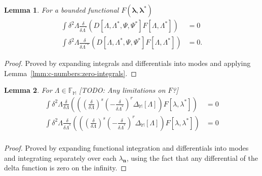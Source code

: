 \documentclass[12pt,aip,jmp,amssymb,amsmath]{revtex4-1}
\newtheorem{lemma}{Lemma}
\begin{document}
\begin{lemma}
\label{lmm:func-calculus:zero-integrals}
    For a bounded functional $F(\boldsymbol{\lambda}, \boldsymbol{\lambda}^*)$
    \begin{equation*}\begin{split}
        \int \delta^2\Lambda
            \frac{\delta}{\delta \Lambda^\prime} \left(
                D[\Lambda, \Lambda^*, \Psi, \Psi^*]
                F[\Lambda, \Lambda^*]
            \right)
        & = 0 \\
        \int \delta^2\Lambda
            \frac{\delta}{\delta \Lambda^{\prime*}}
            \left(
                D[\Lambda, \Lambda^*, \Psi, \Psi^*]
                F[\Lambda, \Lambda^*]
            \right)
        & = 0.
    \end{split}\end{equation*}
\end{lemma}
\begin{proof}
Proved by expanding integrals and differentials into modes and applying Lemma~\ref{lmm:c-numbers:zero-integrals}.
\end{proof}

\begin{lemma}
\label{lmm:func-calculus:zero-delta-integrals}
    For $\Lambda \in \mathbb{F}_{\mathbb{M}}$ [TODO: Any limitations on $F$?]
    \begin{equation*}\begin{split}
        \int \delta^2\Lambda
            \frac{\delta}{\delta \Lambda} \left(
                \left(
                    \left( \frac{\delta}{\delta \Lambda} \right)^s
                    \left( -\frac{\delta}{\delta \Lambda^*} \right)^r
                    \Delta_{\mathbb{M}}[\Lambda]
                \right)
                F[\lambda, \lambda^*]
            \right)
        & = 0 \\
        \int \delta^2\Lambda
            \frac{\delta}{\delta \Lambda^*} \left(
                \left(
                    \left( \frac{\delta}{\delta \Lambda} \right)^s
                    \left( -\frac{\delta}{\delta \Lambda^*} \right)^r
                    \Delta_{\mathbb{M}}[\Lambda]
                \right)
                F[\lambda, \lambda^*]
            \right)
        & = 0 \\
    \end{split}\end{equation*}
\end{lemma}
\begin{proof}
Proved by expanding functional integration and differentials into modes and integrating separately over each $\lambda_{\boldsymbol{n}}$, using the fact that any differential of the delta function is zero on the infinity.
\end{proof}
\end{document}
